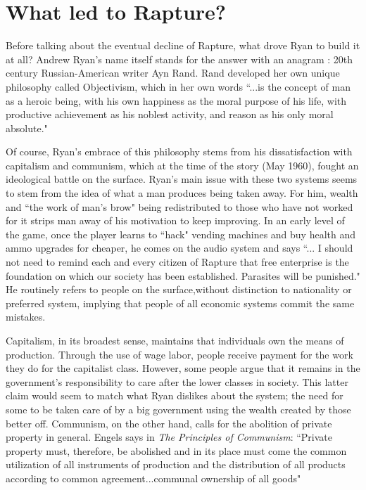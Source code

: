 \documentclass{article}
\begin{document}
\section{What led to Rapture?}
Before talking about the eventual decline of Rapture, what drove Ryan to build it at all? Andrew Ryan's name
itself stands for the answer with an anagram : 
20th century Russian-American writer Ayn Rand. Rand 
developed her own unique philosophy called Objectivism, which in her own words ``...is the concept of man
as a heroic being, with his own happiness as the moral purpose of his life, with productive achievement as
his noblest activity, and reason as his only moral absolute."\textcite{AtlasShrugged}

Of course, Ryan's embrace of this philosophy stems from his dissatisfaction with capitalism and communism,
which at the time of the story (May 1960), fought an ideological battle on the surface. Ryan's 
main issue with these two systems seems to stem from the idea of what a man produces being taken away. For 
him, wealth and ``the work of man's brow" being redistributed to those who have not worked for it strips man
away of his motivation to keep improving. In an early level of the game, once the player learns to ``hack"
vending machines and buy health and ammo upgrades for cheaper, he comes on the audio system and says ``...
I should not need to remind each and every citizen of Rapture that free enterprise is the foundation on which
our society has been established. Parasites will be punished."\textcite{Bioshock} He routinely refers to 
people on the surface,without distinction to nationality or preferred system, implying that people 
of all economic systems commit the same mistakes.

Capitalism, in its broadest sense, maintains that individuals own the means of production. Through the use of
wage labor, people receive payment for the work they do for the capitalist class. \textcite{ComparingEconomics}
However, some people argue that it remains in the government's responsibility to care after the lower classes in
society.  This latter claim would seem to match what Ryan dislikes about the system; the need for some to be 
taken care of by a big government using the wealth created by those better off. Communism, on the other hand,
calls for the abolition of private property in general. Engels says in \textit{The Principles of Communism}:
``Private property must, therefore, be abolished and in its place must come the common utilization of all 
instruments of production and the distribution of all products according to common agreement...communal
ownership of all goods"\textcite{PrinciplesOfCommunism}
\end{document}
